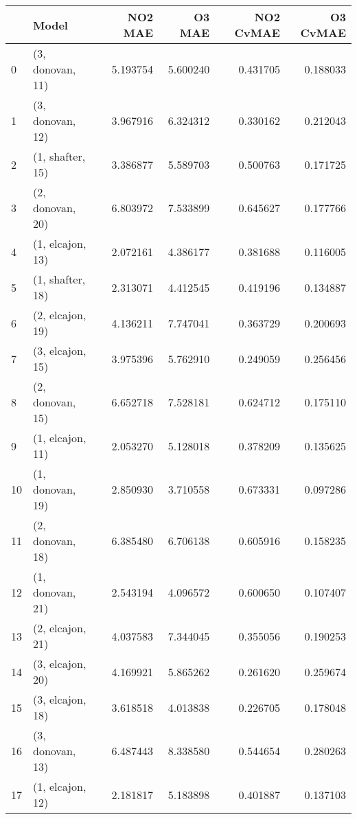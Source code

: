 \begin{tabular}{llrrrr}
\toprule
{} &             Model &   NO2 MAE &    O3 MAE &  NO2 CvMAE &  O3 CvMAE \\
\midrule
0  &  (3, donovan, 11) &  5.193754 &  5.600240 &   0.431705 &  0.188033 \\
1  &  (3, donovan, 12) &  3.967916 &  6.324312 &   0.330162 &  0.212043 \\
2  &  (1, shafter, 15) &  3.386877 &  5.589703 &   0.500763 &  0.171725 \\
3  &  (2, donovan, 20) &  6.803972 &  7.533899 &   0.645627 &  0.177766 \\
4  &  (1, elcajon, 13) &  2.072161 &  4.386177 &   0.381688 &  0.116005 \\
5  &  (1, shafter, 18) &  2.313071 &  4.412545 &   0.419196 &  0.134887 \\
6  &  (2, elcajon, 19) &  4.136211 &  7.747041 &   0.363729 &  0.200693 \\
7  &  (3, elcajon, 15) &  3.975396 &  5.762910 &   0.249059 &  0.256456 \\
8  &  (2, donovan, 15) &  6.652718 &  7.528181 &   0.624712 &  0.175110 \\
9  &  (1, elcajon, 11) &  2.053270 &  5.128018 &   0.378209 &  0.135625 \\
10 &  (1, donovan, 19) &  2.850930 &  3.710558 &   0.673331 &  0.097286 \\
11 &  (2, donovan, 18) &  6.385480 &  6.706138 &   0.605916 &  0.158235 \\
12 &  (1, donovan, 21) &  2.543194 &  4.096572 &   0.600650 &  0.107407 \\
13 &  (2, elcajon, 21) &  4.037583 &  7.344045 &   0.355056 &  0.190253 \\
14 &  (3, elcajon, 20) &  4.169921 &  5.865262 &   0.261620 &  0.259674 \\
15 &  (3, elcajon, 18) &  3.618518 &  4.013838 &   0.226705 &  0.178048 \\
16 &  (3, donovan, 13) &  6.487443 &  8.338580 &   0.544654 &  0.280263 \\
17 &  (1, elcajon, 12) &  2.181817 &  5.183898 &   0.401887 &  0.137103 \\
\bottomrule
\end{tabular}
